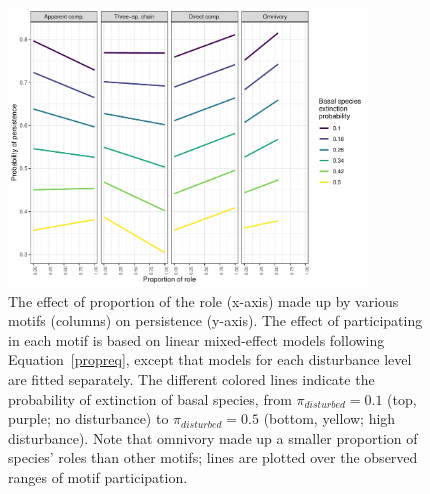 \documentclass[12pt]{article}
\begin{document}
\begin{spacing}{2.0}
            
    \begin{figure}[hb!]
        \centering
        \includegraphics[width=0.85\textwidth]{figures/prop_lmer_allCS.pdf}
        \caption{The effect of proportion of the role (x-axis) made up by various motifs (columns) on persistence (y-axis). The effect of participating in each motif is based on linear mixed-effect models following Equation~\ref{propreq}, except that models for each  disturbance level are fitted separately. The different colored lines indicate the probability of extinction of basal species, from $\pi_{disturbed} = 0.1$ (top, purple; no disturbance) to $\pi_{disturbed} = 0.5$ (bottom, yellow; high disturbance). Note that omnivory made up a smaller proportion of species' roles than other motifs; lines are plotted over the observed ranges of motif participation.}
    \label{fig:prop_lmer_all}
    \end{figure}
        

\end{spacing}
\end{document}
